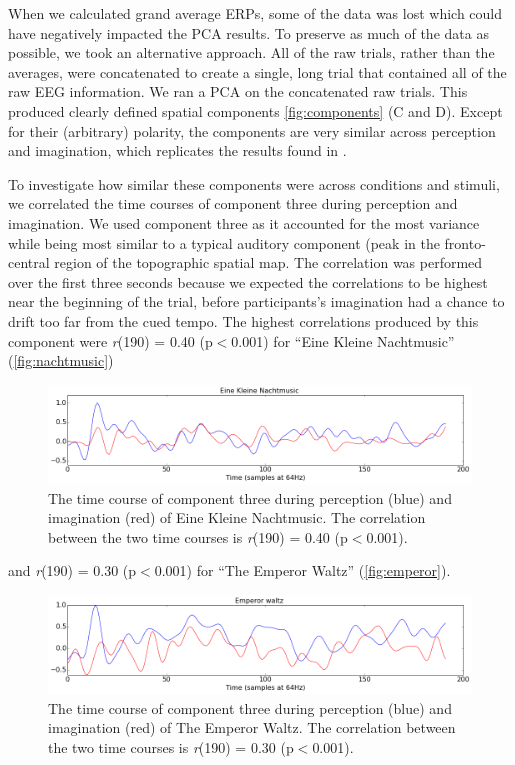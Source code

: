 When we calculated grand average \acp{ERP}, some of the data was lost which could have negatively impacted the \ac{PCA} results.
To preserve as much of the data as possible, we took an alternative approach. 
All of the raw trials, rather than the averages, were concatenated to create a single, long trial that contained all of the raw EEG information.
We ran a \ac{PCA} on the concatenated raw trials. 
This produced clearly defined spatial components \autoref{fig:components} (C and D).
Except for their (arbitrary) polarity, the components are very similar across perception and imagination, which replicates the results found in \cite{schaefer_name_2011}.

To investigate how similar these components were across conditions and stimuli, we correlated the time courses of component three during perception and imagination.
We used component three as it accounted for the most variance while being most similar to a typical auditory component (peak in the fronto-central region of the topographic spatial map. 
The correlation was performed over the first three seconds because we expected the correlations to be highest near the beginning of the trial, before participants's imagination had a chance to drift too far from the cued tempo.
The highest correlations produced by this component were \textit{r}(190) = 0.40 (p$<$0.001) for ``Eine Kleine Nachtmusic'' (\autoref{fig:nachtmusic})
\begin{figure}[htbp]
  \centerline{\includegraphics[scale=0.4]{Figures/TimeCourse-EineKleineCorrelation}}
  \caption{The time course of component three during perception (blue) and imagination (red) of Eine Kleine Nachtmusic. The correlation between the two time courses is \textit{r}(190) = 0.40 (p$<$0.001).}
  \label{fig:nachtmusic}
\end{figure}
and \textit{r}(190) = 0.30 (p$<$0.001) for ``The Emperor Waltz'' (\autoref{fig:emperor}).
\begin{figure}[htbp]
  \centerline{\includegraphics[scale=0.4]{Figures/TimeCourse-EmperorCorrelation}}
  \caption{The time course of component three during perception (blue) and imagination (red) of The Emperor Waltz. The correlation between the two time courses is \textit{r}(190) = 0.30 (p$<$0.001).}
  \label{fig:emperor}
\end{figure}
